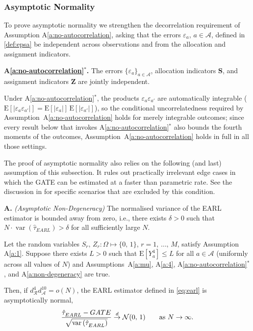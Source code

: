 \documentclass[sigconf]{acmart}
\newcounter{assumption}
\newenvironment{assumption}{\refstepcounter{assumption}\par\medskip\noindent\textbf{A\theassumption.}\enspace}{\par\medskip}
\newenvironment{assumptionstar}[1]{\par\medskip\noindent\textbf{#1.}\enspace}{\par\medskip}
\newcommand{\E}{\mathrm E}
\DeclareMathOperator{\var}{var}
\begin{document}
\subsubsection{Asymptotic Normality}

To prove asymptotic normality we strengthen the decorrelation requirement of Assumption A\ref{a:no-autocorrelation}, asking that the errors $\varepsilon_a$, $a\in\mathcal A$, defined in \eqref{def:epsa} be independent across observations and from the allocation and assignment indicators.

\begin{assumptionstar}{A\ref{a:no-autocorrelation}$^*$}
The errors $\{\varepsilon_a\}_{a\in\mathcal A}$, allocation indicators $\mathbf S$, and assignment indicators $\mathbf Z$ are jointly independent.
\end{assumptionstar}

Under A\ref{a:no-autocorrelation}$^*$, the products $\varepsilon_a\varepsilon_{a'}$ are automatically integrable ($\E[|\varepsilon_a\varepsilon_{a'}|] = \E[|\varepsilon_a|]\,\E[|\varepsilon_{a'}|]$), so the conditional uncorrelatedness required by Assumption~A\ref{a:no-autocorrelation} holds for merely integrable outcomes; since every result below that invokes A\ref{a:no-autocorrelation}$^*$ also bounds the fourth moments of the outcomes, Assumption~A\ref{a:no-autocorrelation} holds in full in all those settings.

The proof of asymptotic normality also relies on the following (and last) assumption of this subsection. It rules out practically irrelevant edge cases in which the GATE can be estimated at a faster than parametric rate. See the discussion in \cite[p.~475]{harshaw2023erl} for specific scenarios that are excluded by this condition.

\begin{assumption}\label{a:non-degeneracy} \textit{(Asymptotic Non-Degeneracy)} The normalised variance of the EARL estimator is bounded away from zero, i.e., there exists $\delta >0$ such that $N\cdot\var(\hat\tau_{EARL}) > \delta$ for all sufficiently large $N$.
\end{assumption}

\begin{theorem}\label{th:asymptotic-normality}
    Let the random variables $S_r,\,Z_r\colon\Omega\mapsto\{0,\,1\}$, $r=1,\,\ldots,\,M$, satisfy Assumption A\ref{a:1}. Suppose there exists $L>0$ such that $\E[Y_a^4] \le L$ for all $a\in\mathcal A$ (uniformly across all values of $N$) and Assumptions~A\ref{a:mu}, A\ref{a:4}, A\ref{a:no-autocorrelation}$^*$, and A\ref{a:non-degeneracy} are true.

    Then, if $d^{4}_{\mathcal{R}}d^{10}_{\mathcal{A}}=o(N)$, the EARL estimator defined in \eqref{eq:earl} is asymptotically normal,
    \begin{equation*}
        \frac{\hat\tau^{\phantom{1}}_{EARL} - GATE}{\sqrt{\var\left(\hat\tau^{\phantom{1}}_{EARL}\right)}}\stackrel{d}{\to} \mathcal{N}(0,\,1)\qquad \textup{as }N\to\infty.
    \end{equation*}
\end{theorem}
\end{document}
